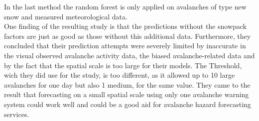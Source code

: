 \documentclass[../masterarbeit.tex]{subfiles}
\begin{document}
In the last method the random forest is only applied on avalanches of type new snow and measured meteorological data. \autocite[]{Harvey:2016}\\
One finding of the resulting study is that the predictions without the snowpack factors are just as good as those without this additional data. Furthermore, they concluded that their prediction attempts were severely limited by inaccurate in the visual observed avalanche activity data, the biased avalanche-related data and by the fact that the spatial scale is too large for their models. The Threshold, wich they did use for the study, is too different, as it allowed up to 10 large avalanches for one day but also 1 medium, for the same value. They came to the result that forecasting on a small spatial scale using only one avalanche warning system could work well and could be a good aid for avalanche hazard forecasting services. \autocite[]{Harvey:2016}\\~\\
 
\end{document}

